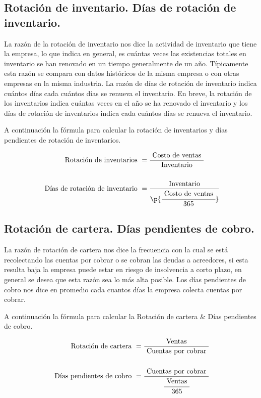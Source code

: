 \documentclass{article}
\begin{document}
\subsection{Rotación de inventario. Días de rotación de inventario.}
La razón de la rotación de inventario nos dice la actividad de inventario que tiene la empresa, lo que indica en general, es cuántas veces las existencias totales en inventario se han renovado en un tiempo generalmente de un año. Típicamente esta razón se compara con datos históricos de la misma empresa o con otras empresas en la misma industria. La razón de días de rotación de inventario indica cuántos días cada cuántos días se renueva el inventario. En breve, la rotación de los inventarios indica cuántas veces en el año se ha renovado el inventario y los días de rotación de inventarios indica cada cuántos días se renueva el inventario. 
\par 
A continuación la fórmula para calcular la rotación de inventarios y días pendientes de rotación de inventarios.
\begin{center}
   \begin{align*}
       \text{ Rotación de inventarios } &= \frac{\text{ Costo de ventas }}{ \text{ Inventario } } \\ \\ 
       \text{ Días de rotación de inventario } &= \frac{\text{ Inventario }}{ \p{\cfrac{\text{ Costo de ventas }}{365}} } \\ 
   \end{align*}
\end{center}


\subsection{Rotación de cartera. Días pendientes de cobro.}
La razón de rotación de cartera nos dice la frecuencia con la cual se está recolectando las cuentas por cobrar o se cobran las deudas a acreedores, si esta resulta baja la empresa puede estar en riesgo de insolvencia a corto plazo, en general se desea que esta razón sea lo más alta posible. Los días pendientes de cobro nos dice en promedio cada cuantos días la empresa colecta cuentas por cobrar. 
\par
A continuación la fórmula para calcular la Rotación de cartera \& Días pendientes de cobro.
\begin{center}
   \begin{align*}
       \text{ Rotación de cartera } &= \frac{\text{ Ventas }}{\text{ Cuentas por cobrar }} 
       \\ \\ 
       \text{ Días pendientes de cobro } &= \frac{\text{ Cuentas por cobrar  }}{\cfrac{\text{ Ventas }}{365}} 
       \\ 
   \end{align*}
\end{center}
\end{document}
